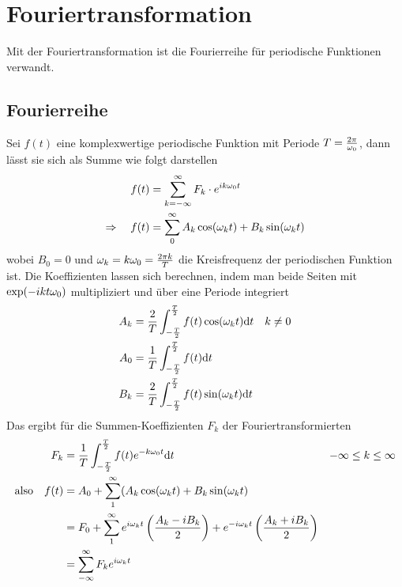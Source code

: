 
\chapter{Fouriertransformation}\label{fouriertrafo}


Mit der Fouriertransformation ist die Fourierreihe für periodische
Funktionen verwandt.

\section{Fourierreihe}
Sei $f(t)$ eine komplexwertige periodische Funktion mit Periode
$T=\frac{2\pi}{\omega_0}$, dann lässt sie sich als Summe wie folgt darstellen
\begin{align*}
  f(t) &= \sum_{k=-\infty}^{\infty} F_k\cdot e^{ik\omega_0 t}\\
  \Rightarrow\quad 
  f(t) &= \sum_0^{\infty} A_k\cos(\omega_k t)+B_k\sin(\omega_k t)
\end{align*}
wobei $B_0=0$ und $\omega_k=k\omega_0=\frac{2\pi k}{T}$ die
Kreisfrequenz der periodischen Funktion ist. Die Koeffizienten lassen
sich berechnen, indem man beide Seiten mit $\exp(-ikt\omega_0)$
multipliziert und über eine Periode integriert
\begin{align*}
  A_k &= \frac{2}{T} \int_{-\frac{T}{2}}^{\frac{T}{2}}
        f(t)\cos(\omega_k t)\mathrm{d} t
  & k&\neq 0\\
  A_0 &= \frac{1}{T}\int_{-\frac{T}{2}}^{\frac{T}{2}} f(t)\mathrm{d} t\\
  B_k &= \frac{2}{T}\int_{-\frac{T}{2}}^{\frac{T}{2}}
        f(t)\sin(\omega_k t)\mathrm{d} t\\
\end{align*}
Das ergibt für die Summen-Koeffizienten $F_k$ der
Fouriertransformierten
\begin{align*}
  F_k &= \frac{1}{T}\int_{-\frac{T}{2}}^{\frac{T}{2}}
        f(t) e^{-k\omega_0 t}\mathrm{d} t
  &-\infty &\leq k\leq\infty\\
  \text{also}\quad 
  f(t) &= A_0 + \sum_{1}^{\infty}(A_k\cos(\omega_k t) + B_k\sin(\omega_k t)\\
      &= F_0 + \sum_{1}^{\infty}e^{i\omega_kt} 
        \left( \frac{A_k-iB_k}{2} \right)
        + e^{-i\omega_kt}\left( \frac{A_k+iB_k}{2} \right)\\
      &= \sum_{-\infty}^{\infty} F_k e^{i\omega_k t}
\end{align*}

